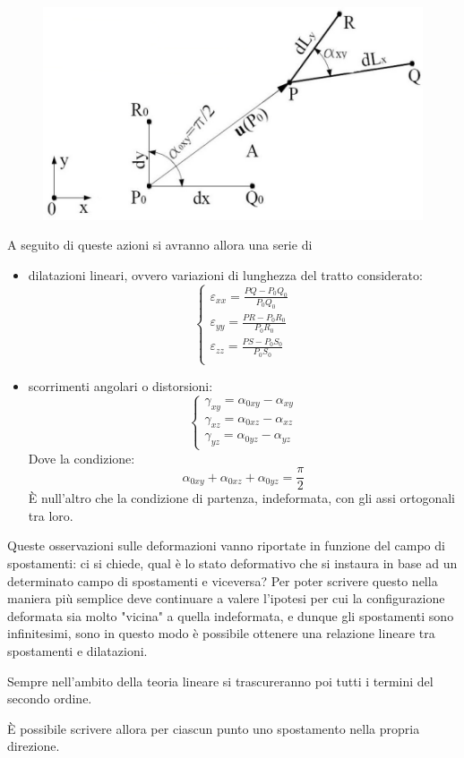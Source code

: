 \documentclass{article}
\begin{document}
\begin{adjustwidth}{2in}{}
\begin{figure}[H]
	\centering
	\includegraphics[width=0.4\linewidth]{immagini/1.PARTE7_Pagina_23}
\end{figure}
	A seguito di queste azioni si avranno allora una serie di
\begin{itemize}
		\item dilatazioni lineari, ovvero variazioni di lunghezza del tratto considerato: 
	\[\begin{cases}		
	\varepsilon_{xx} = \frac{PQ-P_0Q_0}{P_0Q_0} \\	
	\varepsilon_{yy} = \frac{PR-P_0R_0}{P_0R_0} \\	
  	\varepsilon_{zz} = \frac{PS-P_0S_0}{P_0S_0} \\
	\end{cases}
  	\]
	\item scorrimenti angolari o distorsioni: 
	\[\begin{cases}		
	\gamma_{xy} = \alpha_{0xy} - \alpha_{xy}\\
	\gamma_{xz} = \alpha_{0xz} - \alpha_{xz}\\
	\gamma_{yz} = \alpha_{0yz} - \alpha_{yz}
	\end{cases}
	\]
	Dove la condizione: 
	\[ \alpha_{0xy} + \alpha_{0xz} + \alpha_{0yz} = \frac{\pi}{2}
	\]
	È null'altro che la condizione di partenza, indeformata, con gli assi ortogonali tra loro.
\end{itemize}
	Queste osservazioni  sulle deformazioni vanno riportate in funzione del campo di spostamenti: ci si chiede, qual è lo stato deformativo che si instaura in base ad un determinato campo di spostamenti e viceversa? Per poter scrivere questo nella maniera più semplice deve continuare a valere l'ipotesi per cui la configurazione deformata sia molto "vicina" a quella indeformata, e dunque gli spostamenti sono infinitesimi, sono in questo modo è possibile ottenere una relazione lineare tra spostamenti e dilatazioni. 
	
	Sempre nell'ambito della teoria lineare si trascureranno poi tutti i termini del secondo ordine. 
	
\newpage
	
	È possibile scrivere allora per ciascun punto uno spostamento nella propria direzione.
	

\end{adjustwidth}
\end{document}
